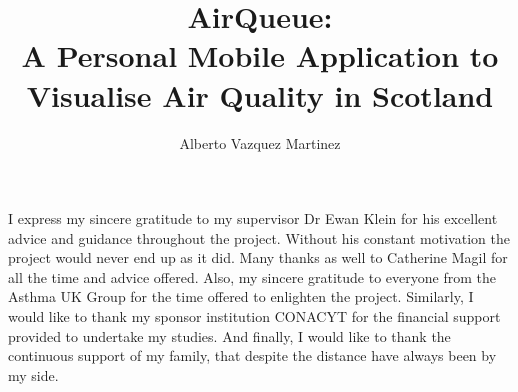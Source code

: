 \documentclass[bsc,logo, abbrevs]{infthesis}
\title{AirQueue: \protect\\ A Personal Mobile Application to Visualise Air Quality in Scotland}
\author{Alberto Vazquez Martinez}
\begin{document}
\begin{preliminary}

\maketitle
\begin{acknowledgements}

I express my sincere gratitude to my supervisor Dr Ewan Klein for his excellent advice and guidance throughout the project. Without his constant motivation the project would never end up as it did.
Many thanks as well to Catherine Magil for all the time and advice offered. Also, my sincere gratitude to everyone from the Asthma UK Group for the time offered to enlighten the project. Similarly, I would like to thank my sponsor institution CONACYT for the financial support provided to undertake my studies. And finally, I would like to thank the continuous support of my family, that despite the distance have always been by my side.

\end{acknowledgements}

\standarddeclaration

\tableofcontents
\listoffigures
\iffalse
\listoftables
\begin{accron}\end{accron}
\fi
\end{preliminary}













\appendix

\end{document}
